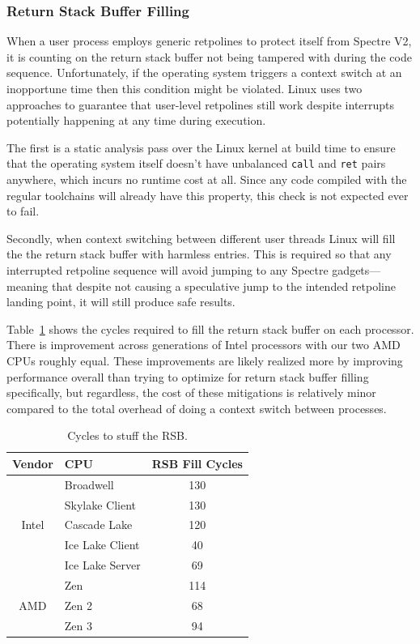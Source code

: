 \subsubsection{Return Stack Buffer Filling}

When a user process employs generic retpolines to protect itself from Spectre V2, it is counting on the return stack buffer not being tampered with during the code sequence.
Unfortunately, if the operating system triggers a context switch at an inopportune time then this condition might be violated.
Linux uses two approaches to guarantee that user-level retpolines still work despite interrupts potentially happening at any time during execution.

The first is a static analysis pass over the Linux kernel at build time to ensure that the operating system itself doesn't have  unbalanced \texttt{call} and \texttt{ret} pairs anywhere, which incurs no runtime cost at all.
Since any code compiled with the regular toolchains will already have this property, this check is not expected ever to fail.

Secondly, when context switching between different user threads Linux will fill the the return stack buffer with harmless entries.
This is required so that any interrupted retpoline sequence will avoid jumping to any Spectre gadgets---meaning that despite not causing a speculative jump to the intended retpoline landing point, it will still produce safe results.

Table~\ref{table:rsb-fill} shows the cycles required to fill the return stack buffer on each processor.
There is improvement across generations of Intel processors with our two AMD CPUs roughly equal.
These improvements are likely realized more by improving performance overall
than trying to optimize for return stack buffer filling specifically, but regardless, the cost of these mitigations is relatively minor compared to the total overhead of doing a context switch between processes.

\begin{table}[h]
  \begin{center}
  \begin{tabular}{clc}
      \textbf{Vendor} & \textbf{CPU} & \textbf{RSB Fill Cycles} \\ \hline
      \multirow{5}{*}{Intel} & Broadwell       & 130 \\
                             & Skylake Client  & 130 \\
                             & Cascade Lake    & 120 \\
                             & Ice Lake Client & 40 \\
                             & Ice Lake Server & 69 \\ \hline
      \multirow{3}{*}{AMD}   & Zen             & 114 \\
                             & Zen 2           & 68 \\
                             & Zen 3           & 94 \\ \hline
  \end{tabular}
  \end{center}
  \caption{Cycles to stuff the RSB. }
  \label{table:rsb-fill}
\end{table}

